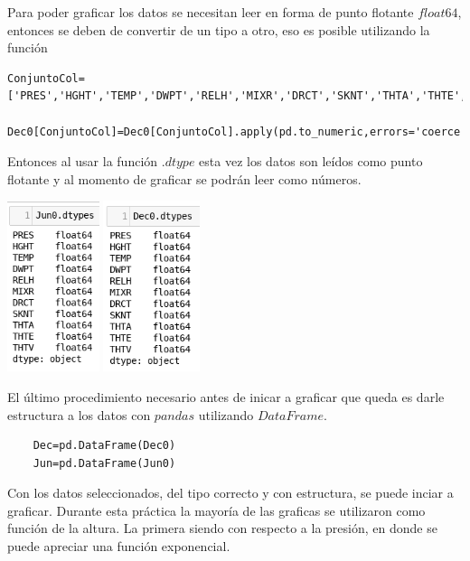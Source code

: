 \documentclass{article}
\begin{document}
    Para poder graficar los datos se necesitan leer en forma de punto flotante $float64$, entonces se deben de convertir de un tipo a otro, eso es posible utilizando la función

	\begin{verbatim}ConjuntoCol=['PRES','HGHT','TEMP','DWPT','RELH','MIXR','DRCT','SKNT','THTA','THTE','THTV']
	Dec0[ConjuntoCol]=Dec0[ConjuntoCol].apply(pd.to_numeric,errors='coerce',axis=1)
    \end{verbatim}
    
    Entonces al usar la función $.dtype$ esta vez los datos son leídos como punto flotante y al momento de graficar se podrán leer como números.
    
    \begin{center}
    \includegraphics[height=5cm]{JunTypeFlot.png}
    \includegraphics[height=5cm]{DecTypeFlot.png}
    \end{center}
    
    El último procedimiento necesario antes de inicar a graficar que queda es darle estructura a los datos con $pandas$ utilizando $DataFrame$.
    \begin{verbatim}
    Dec=pd.DataFrame(Dec0)
    Jun=pd.DataFrame(Jun0)
    \end{verbatim}
    
    Con los datos seleccionados, del tipo correcto y con estructura, se puede inciar a graficar. Durante esta práctica la mayoría de las graficas se utilizaron como función de la altura. La primera siendo con respecto a la presión, en donde se puede apreciar una función exponencial.
    
\end{document}
